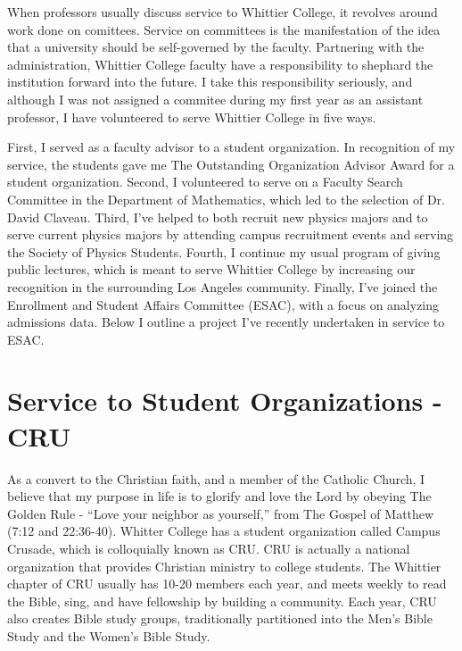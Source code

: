 \documentclass[../main.tex]{subfiles}
\begin{document}
When professors usually discuss service to Whittier College, it revolves around work done on comittees.  Service on committees is the manifestation of the idea that a university should be self-governed by the faculty.  Partnering with the administration, Whittier College faculty have a responsibility to shephard the institution forward into the future.  I take this responsibility seriously, and although I was not assigned a commitee during my first year as an assistant professor, I have volunteered to serve Whittier College in five ways. \\ \hspace{0.1cm}

First, I served as a faculty advisor to a student organization.  In recognition of my service, the students gave me The Outstanding Organization Advisor Award for a student organization.  Second, I volunteered to serve on a Faculty Search Committee in the Department of Mathematics, which led to the selection of Dr. David Claveau.  Third, I've helped to both recruit new physics majors and to serve current physics majors by attending campus recruitment events and serving the Society of Physics Students.  Fourth, I continue my usual program of giving public lectures, which is meant to serve Whittier College by increasing our recognition in the surrounding Los Angeles community.  Finally, I've joined the Enrollment and Student Affairs Committee (ESAC), with a focus on analyzing admissions data.  Below I outline a project I've recently undertaken in service to ESAC. \\ \hspace{0.1cm}

\section{Service to Student Organizations - CRU}

As a convert to the Christian faith, and a member of the Catholic Church, I believe that my purpose in life is to glorify and love the Lord by obeying The Golden Rule - ``Love your neighbor as yourself,'' from The Gospel of Matthew (7:12 and 22:36-40).  Whitter College has a student organization called Campus Crusade, which is colloquially known as CRU.  CRU is actually a national organization that provides Christian ministry to college students.  The Whittier chapter of CRU usually has 10-20 members each year, and meets weekly to read the Bible, sing, and have fellowship by building a community.  Each year, CRU also creates Bible study groups, traditionally partitioned into the Men's Bible Study and the Women's Bible Study. \\ \hspace{0.1cm}
\end{document}
